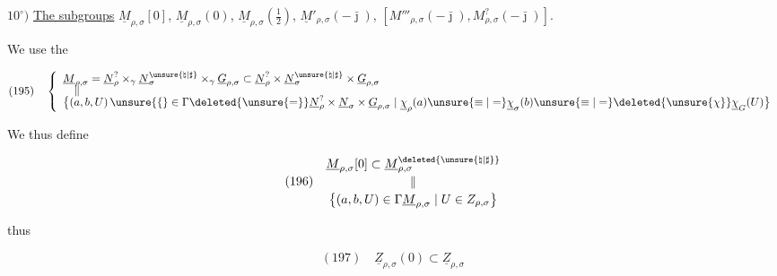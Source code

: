 
$10^{\circ})$ \uline{The subgroups}
$\underline M_{\rho,\sigma}[0]$, $\underline M_{\rho,\sigma}(0)$,
$\underline M_{\rho,\sigma}(\frac12)$,
$\underline M'_{\rho,\sigma}(-\bar\jmath)$,
$[M'''_{\rho,\sigma}(-\bar\jmath),M^{?}_{\rho,\sigma}(-\bar\jmath)]$.

We use the 

\[
(195)\quad
\left\{\begin{array}{l}
\underline M_{\rho,\sigma}
=\underline N_\rho^{?}\times_\gamma
 \underline N_\sigma^{\unsure{\natural|\sharp}}\times_\gamma
 \underline G_{\rho,\sigma}
\subset\underline N_\rho^{?}\times
 \underline N_\sigma^{\unsure{\natural|\sharp}}\times
 \underline G_{\rho,\sigma}
\\[-2pt]
\quad\Vert
\\[-2pt]
\bigl\{(a,b,U)\,\unsure{\{}\in
 \Gamma\deleted{\unsure{=}}\underline N_\rho^{?}
 \times\underline N_\sigma\times\underline G_{\rho,\sigma}
 \mid\underline\chi_\rho(a)\unsure{\equiv|=}
 \underline\chi_\sigma(b)\unsure{\equiv|=}
 \deleted{\unsure{\chi}}\underline\chi_G(U)\bigr\}
\end{array}\right.
\]

We thus define

\[
(196)\quad\begin{gathered}
\underline M_{\rho,\sigma}[0]\subset
\underline M_{\rho,\sigma}^{\deleted{\unsure{\natural|\sharp}}}
\\[-2pt]
\Vert
\\[-2pt]
\bigl\{(a,b,U)\in\Gamma\underline M_{\rho,\sigma}
 \mid U\in Z_{\rho,\sigma}\bigr\}
\end{gathered}
\]


thus


\[
(197)\quad\underline Z_{\rho,\sigma}(0)\subset\underline Z_{\rho,\sigma}
\]

